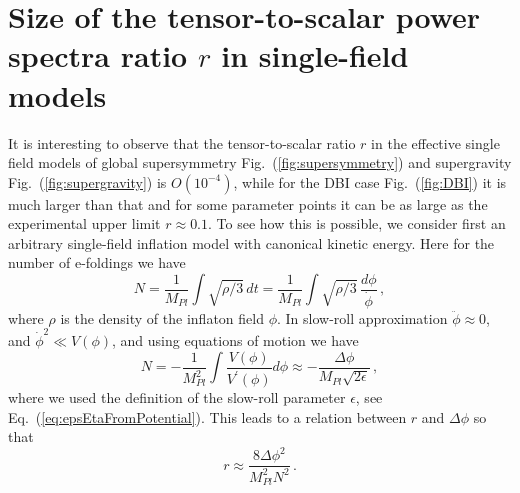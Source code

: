 \documentclass[12pt]{article}
\begin{document}
\section{Size of the tensor-to-scalar power spectra ratio $r$ in single-field models \label{sec:r}}
It is interesting to observe that the tensor-to-scalar ratio $r$ in the effective single field models of global supersymmetry Fig.~(\ref{fig:supersymmetry}) and supergravity Fig.~(\ref{fig:supergravity}) is $O\left(10^{-4}\right)$, while for the DBI case Fig.~(\ref{fig:DBI}) it is much larger than that and for some parameter points it can be as large as the experimental upper limit $r \approx 0.1$.
To see how this is possible, we consider first an arbitrary single-field inflation model with canonical kinetic energy.
Here for the number of e-foldings we have
\begin{equation} \label{eq:efoldingsGeneral}
  N = \frac{1}{M_{Pl}} \int \sqrt{\rho / 3}\,dt
    = \frac{1}{M_{Pl}} \int \sqrt{\rho / 3}\,\frac{d\phi}{\dot \phi}\,,
\end{equation}
where $\rho$ is the density of the inflaton field $\phi$.
In slow-roll approximation $\ddot \phi \approx 0$, and ${\dot \phi}^2 \ll V\left(\phi\right)$, and using equations of motion we have
\begin{equation} \label{eq:efoldingsCanonical}
  N = - \frac{1}{M_{Pl}^2} \int \frac{V\left(\phi\right)}{V^\prime\left(\phi\right)} d\phi
    \approx - \frac{\Delta \phi}{M_{Pl} \sqrt{2 \epsilon}}\,,
\end{equation}
where we used the definition of the slow-roll parameter $\epsilon$, see Eq.~(\ref{eq:epsEtaFromPotential}).
This leads to a relation between $r$ and $\Delta \phi$ so that
\begin{equation} \label{eq:Deltaphi}
  r \approx \frac{8 \Delta\phi^2}{M_{Pl}^2 N^2}\,.
\end{equation}
\end{document}

